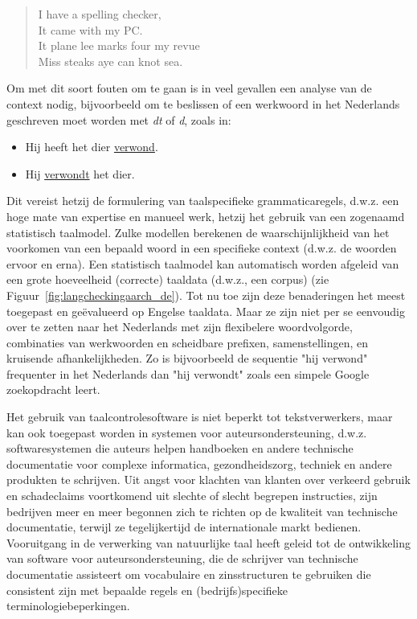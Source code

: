 \documentclass[]{../../metanetpaper}
\begin{document}
\begin{multicols}{2}
\begin{quote}
  I have a spelling checker,\\
  It came with my PC.\\
  It plane lee marks four my revue\\
  Miss steaks aye can knot sea.
\end{quote}



    Om met dit soort fouten om te gaan is in veel gevallen een analyse van de context nodig, bijvoorbeeld om te beslissen of een werkwoord in het Nederlands geschreven moet worden met \emph{dt} of \emph{d}, zoals in:

\begin{itemize}
 \item   Hij heeft het dier \underline{verwond}.
 \item   Hij \underline{verwondt} het dier.
\end{itemize}



    Dit vereist hetzij de formulering van taalspecifieke grammaticaregels, d.w.z. een hoge mate van expertise en manueel werk, hetzij het gebruik van een zogenaamd statistisch taalmodel. Zulke modellen berekenen de waarschijnlijkheid van het voorkomen van een bepaald woord in een specifieke context (d.w.z. de woorden ervoor en erna). Een statistisch taalmodel kan automatisch worden afgeleid van een grote hoeveelheid (correcte) taaldata (d.w.z., een corpus) (zie Figuur~\ref{fig:langcheckingaarch_de}). Tot nu toe zijn deze benaderingen het meest toegepast en ge{\"e}valueerd op Engelse taaldata. Maar ze zijn niet per se eenvoudig over te zetten naar het Nederlands met zijn flexibelere woordvolgorde, combinaties van werkwoorden en scheidbare prefixen, samenstellingen, en kruisende afhankelijkheden. Zo is bijvoorbeeld de sequentie "hij verwond" frequenter in het Nederlands dan "hij verwondt" zoals een simpele Google zoekopdracht leert.


    Het gebruik van taalcontrolesoftware is niet beperkt tot tekstverwerkers, maar kan ook toegepast worden in systemen voor auteursondersteuning, d.w.z. softwaresystemen die auteurs helpen handboeken en andere technische documentatie voor complexe informatica, gezondheidszorg, techniek en andere produkten te schrijven.  Uit angst voor klachten van klanten over verkeerd gebruik en schadeclaims voortkomend uit slechte of slecht begrepen instructies, zijn bedrijven meer en meer begonnen zich te richten op de kwaliteit van technische documentatie, terwijl ze tegelijkertijd de internationale markt bedienen. Vooruitgang in de verwerking van natuurlijke taal heeft geleid tot de ontwikkeling van software voor auteursondersteuning, die de schrijver van technische documentatie assisteert om vocabulaire en zinsstructuren te gebruiken die consistent zijn met bepaalde regels en (bedrijfs)specifieke terminologiebeperkingen.




\end{multicols}
\end{document}
